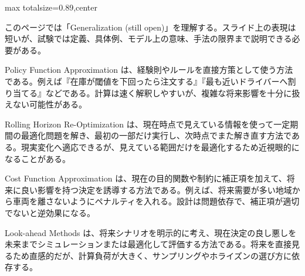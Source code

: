 \begin{minipage}[t]{0.58\textwidth}
\begin{adjustbox}{max totalsize={\textwidth}{0.89\textheight},center}
\begin{minipage}{\textwidth}\scriptsize
{}このページでは「Generalization (still open)」を理解する。スライド上の表現は短いが、試験では定義、具体例、モデル上の意味、手法の限界まで説明できる必要がある。\par
Policy Function Approximation は、経験則やルールを直接方策として使う方法である。例えば『在庫が閾値を下回ったら注文する』『最も近いドライバーへ割り当てる』などである。計算は速く解釈しやすいが、複雑な将来影響を十分に扱えない可能性がある。\par
Rolling Horizon Re-Optimization は、現在時点で見えている情報を使って一定期間の最適化問題を解き、最初の一部だけ実行し、次時点でまた解き直す方法である。現実変化へ適応できるが、見えている範囲だけを最適化するため近視眼的になることがある。\par
Cost Function Approximation は、現在の目的関数や制約に補正項を加えて、将来に良い影響を持つ決定を誘導する方法である。例えば、将来需要が多い地域から車両を離さないようにペナルティを入れる。設計は問題依存で、補正項が適切でないと逆効果になる。\par
Look-ahead Methods は、将来シナリオを明示的に考え、現在決定の良し悪しを未来までシミュレーションまたは最適化して評価する方法である。将来を直接見るため直感的だが、計算負荷が大きく、サンプリングやホライズンの選び方に依存する。\par

\end{minipage}
\end{adjustbox}
\end{minipage}
